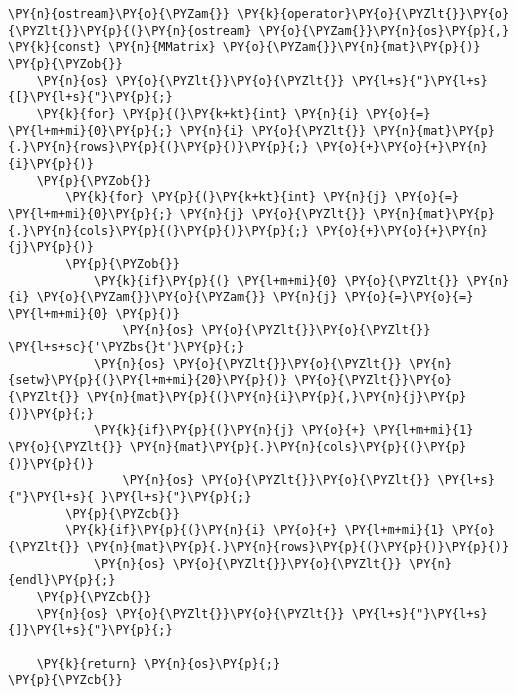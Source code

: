 \begin{Verbatim}[commandchars=\\\{\}]
\PY{n}{ostream}\PY{o}{\PYZam{}} \PY{k}{operator}\PY{o}{\PYZlt{}}\PY{o}{\PYZlt{}}\PY{p}{(}\PY{n}{ostream} \PY{o}{\PYZam{}}\PY{n}{os}\PY{p}{,} \PY{k}{const} \PY{n}{MMatrix} \PY{o}{\PYZam{}}\PY{n}{mat}\PY{p}{)}
\PY{p}{\PYZob{}}
	\PY{n}{os} \PY{o}{\PYZlt{}}\PY{o}{\PYZlt{}} \PY{l+s}{"}\PY{l+s}{[}\PY{l+s}{"}\PY{p}{;}
	\PY{k}{for} \PY{p}{(}\PY{k+kt}{int} \PY{n}{i} \PY{o}{=} \PY{l+m+mi}{0}\PY{p}{;} \PY{n}{i} \PY{o}{\PYZlt{}} \PY{n}{mat}\PY{p}{.}\PY{n}{rows}\PY{p}{(}\PY{p}{)}\PY{p}{;} \PY{o}{+}\PY{o}{+}\PY{n}{i}\PY{p}{)}
	\PY{p}{\PYZob{}}
		\PY{k}{for} \PY{p}{(}\PY{k+kt}{int} \PY{n}{j} \PY{o}{=} \PY{l+m+mi}{0}\PY{p}{;} \PY{n}{j} \PY{o}{\PYZlt{}} \PY{n}{mat}\PY{p}{.}\PY{n}{cols}\PY{p}{(}\PY{p}{)}\PY{p}{;} \PY{o}{+}\PY{o}{+}\PY{n}{j}\PY{p}{)}
		\PY{p}{\PYZob{}}
			\PY{k}{if}\PY{p}{(} \PY{l+m+mi}{0} \PY{o}{\PYZlt{}} \PY{n}{i} \PY{o}{\PYZam{}}\PY{o}{\PYZam{}} \PY{n}{j} \PY{o}{=}\PY{o}{=} \PY{l+m+mi}{0} \PY{p}{)}
				\PY{n}{os} \PY{o}{\PYZlt{}}\PY{o}{\PYZlt{}} \PY{l+s+sc}{'\PYZbs{}t'}\PY{p}{;}
			\PY{n}{os} \PY{o}{\PYZlt{}}\PY{o}{\PYZlt{}} \PY{n}{setw}\PY{p}{(}\PY{l+m+mi}{20}\PY{p}{)} \PY{o}{\PYZlt{}}\PY{o}{\PYZlt{}} \PY{n}{mat}\PY{p}{(}\PY{n}{i}\PY{p}{,}\PY{n}{j}\PY{p}{)}\PY{p}{;}
			\PY{k}{if}\PY{p}{(}\PY{n}{j} \PY{o}{+} \PY{l+m+mi}{1} \PY{o}{\PYZlt{}} \PY{n}{mat}\PY{p}{.}\PY{n}{cols}\PY{p}{(}\PY{p}{)}\PY{p}{)}
				\PY{n}{os} \PY{o}{\PYZlt{}}\PY{o}{\PYZlt{}} \PY{l+s}{"}\PY{l+s}{ }\PY{l+s}{"}\PY{p}{;}
		\PY{p}{\PYZcb{}}
		\PY{k}{if}\PY{p}{(}\PY{n}{i} \PY{o}{+} \PY{l+m+mi}{1} \PY{o}{\PYZlt{}} \PY{n}{mat}\PY{p}{.}\PY{n}{rows}\PY{p}{(}\PY{p}{)}\PY{p}{)}
			\PY{n}{os} \PY{o}{\PYZlt{}}\PY{o}{\PYZlt{}} \PY{n}{endl}\PY{p}{;}
	\PY{p}{\PYZcb{}}
	\PY{n}{os} \PY{o}{\PYZlt{}}\PY{o}{\PYZlt{}} \PY{l+s}{"}\PY{l+s}{]}\PY{l+s}{"}\PY{p}{;}

	\PY{k}{return} \PY{n}{os}\PY{p}{;}
\PY{p}{\PYZcb{}}
\end{Verbatim}
